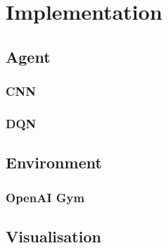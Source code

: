 \chapter{Implementation}
\section{Agent}
\subsection{CNN}

\subsection{DQN}

\section{Environment}
\subsection{OpenAI Gym}

\section{Visualisation}